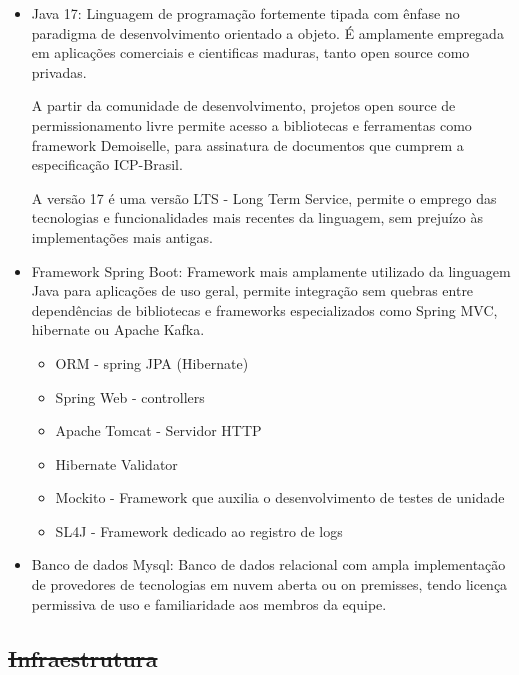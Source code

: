 \documentclass[
    12pt,               %
    openright,          %
    oneside,
    a4paper,            %
    BIBLATEX,           %
    TODO,               %
    english,            %
    brazil              %
    ]{ifsp-spo-inf-ctds}
\providecommand{\DIFdel}[1]{{\protect\color{red}\sout{#1}}}                      %
\providecommand{\DIFdelbegin}{} %
\newcommand{\DIFscaledelfig}{0.5}
\newlength{\DIFdelgraphicswidth} %
\newlength{\DIFdelgraphicsheight} %
\newcommand{\DIFdelincludegraphics}[2][]{%
\sbox{\DIFdelgraphicsbox}{\DIFOincludegraphics[#1]{#2}}%
\settoboxwidth{\DIFdelgraphicswidth}{\DIFdelgraphicsbox} %
\settoboxtotalheight{\DIFdelgraphicsheight}{\DIFdelgraphicsbox} %
\scalebox{\DIFscaledelfig}{%
\parbox[b]{\DIFdelgraphicswidth}{\usebox{\DIFdelgraphicsbox}\\[-\baselineskip] \rule{\DIFdelgraphicswidth}{0em}}\llap{\resizebox{\DIFdelgraphicswidth}{\DIFdelgraphicsheight}{%
\setlength{\unitlength}{\DIFdelgraphicswidth}%
\begin{picture}(1,1)%
\thicklines\linethickness{2pt} %
{\color[rgb]{1,0,0}\put(0,0){\framebox(1,1){}}}%
{\color[rgb]{1,0,0}\put(0,0){\line( 1,1){1}}}%
{\color[rgb]{1,0,0}\put(0,1){\line(1,-1){1}}}%
\end{picture}%
}\hspace*{3pt}}} %
} %
\DeclareRobustCommand{\DIFdelbegin}{\DIFOdelbegin \let\includegraphics\DIFdelincludegraphics} %
\begin{document}
            \begin{itemize}
                \item Java 17: 
                    Linguagem de programação fortemente tipada com ênfase no paradigma de desenvolvimento orientado a objeto. É amplamente empregada em aplicações comerciais e cientificas maduras, tanto open source como privadas.

                    A partir da comunidade de desenvolvimento, projetos open source de permissionamento livre permite acesso a bibliotecas e ferramentas como framework Demoiselle, para assinatura de documentos que cumprem a especificação ICP-Brasil.

                    A versão 17 é uma versão LTS - Long Term Service, permite o emprego das tecnologias e funcionalidades mais recentes da linguagem, sem prejuízo às implementações mais antigas.

                \item Framework Spring Boot: 
                    Framework mais amplamente utilizado da linguagem Java para aplicações de uso geral, permite integração sem quebras entre dependências de bibliotecas e frameworks especializados como Spring MVC, hibernate ou Apache Kafka.
                    \begin{itemize}
                        \item ORM - spring JPA (Hibernate)
                        \item Spring Web - controllers
                        \item Apache Tomcat - Servidor HTTP
                        \item Hibernate Validator
                        \item Mockito - Framework que auxilia o desenvolvimento de testes de unidade
                        \item SL4J - Framework dedicado ao registro de logs
                    \end{itemize}
                \item Banco de dados Mysql:
                    Banco de dados relacional com ampla implementação de provedores de tecnologias em nuvem aberta ou on premisses, tendo licença permissiva de uso e familiaridade aos membros da equipe.
            \end{itemize}

        \DIFdelbegin \subsection{\DIFdel{Infraestrutura}}
\addtocounter{subsection}{-1}%
\end{document}
